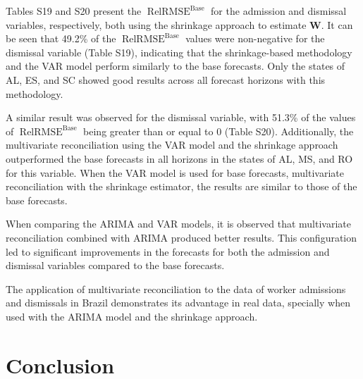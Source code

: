 \documentclass[a4paper,preprint,11pt,authoryear]{elsarticle}
\DeclareMathOperator{\RelRMSE}{RelRMSE}
\DeclareMathOperator{\Base}{Base}
\begin{document}


Tables S19 and S20 present the $\RelRMSE^{\Base}$ for the admission and dismissal variables, respectively, both using the shrinkage approach to estimate $\bm{W}$. It can be seen that 49.2\% of the $\RelRMSE^{\Base}$ values were non-negative for the dismissal variable (Table S19), indicating that the shrinkage-based methodology and the VAR model perform similarly to the base forecasts. Only the states of AL, ES, and SC showed good results across all forecast horizons with this methodology.

A similar result was observed for the dismissal variable, with 51.3\% of the values of $\RelRMSE^{\Base}$ being greater than or equal to 0 (Table S20). Additionally, the multivariate reconciliation using the VAR model and the shrinkage approach outperformed the base forecasts in all horizons in the states of AL, MS, and RO for this variable. When the VAR model is used for base forecasts, multivariate reconciliation with the shrinkage estimator, the results are similar to those of the base forecasts.

When comparing the ARIMA and VAR models, it is observed that multivariate reconciliation combined with ARIMA produced better results. This configuration led to significant improvements in the forecasts for both the admission and dismissal variables compared to the base forecasts.


The application of multivariate reconciliation to the data of worker admissions and dismissals in Brazil demonstrates its advantage in real data, specially when used with the ARIMA model and the shrinkage approach.

\section{Conclusion}
\label{sec5}
\end{document}
